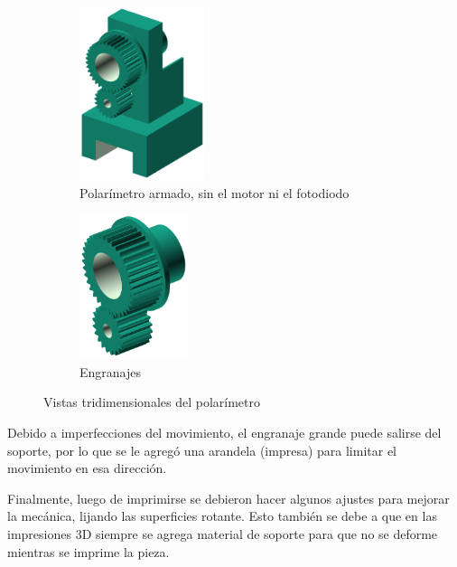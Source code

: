 \begin{figure}[H]
    \begin{subfigure}{0.5\textwidth}
        \centering
        \includegraphics[width=0.4\textwidth]{fig/polarimetro/soporte_all}
        \caption{Polarímetro armado, sin el motor ni el fotodiodo}
        \label{fig:polarimetro/soporte}
    \end{subfigure}
    \begin{subfigure}{0.5\textwidth}
        \centering
        \includegraphics[width=0.35\textwidth]{fig/polarimetro/engranajes}
        \caption{Engranajes}
        \label{fig:polarimetro/engranajes}
    \end{subfigure}
    \caption{Vistas tridimensionales del polarímetro}
\end{figure}

Debido a imperfecciones del movimiento, el engranaje grande puede salirse del soporte, por lo que se le agregó una arandela (impresa) para limitar el movimiento en esa dirección. 

Finalmente, luego de imprimirse se debieron hacer algunos ajustes para mejorar la mecánica, lijando las superficies rotante. Esto también se debe a que en las impresiones 3D siempre se agrega material de soporte para que no se deforme mientras se imprime la pieza.

